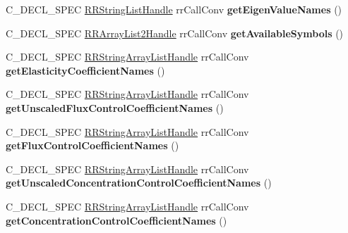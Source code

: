 \begin{DoxyCompactItemize}
\item 
\hypertarget{group__loadsave_ga313f81d4fae0ece305eb1246543bcdc3}{
\-C\-\_\-\-D\-E\-C\-L\-\_\-\-S\-P\-E\-C \hyperlink{rr__c__types_8h_abf561b014879247b7b92ee99c205de21}{\-R\-R\-String\-List\-Handle} \*
rr\-Call\-Conv {\bfseries get\-Eigen\-Value\-Names} ()}
\label{group__loadsave_ga313f81d4fae0ece305eb1246543bcdc3}

\item 
\hypertarget{group__loadsave_gaa06a430f57d4df400e58fd954766901c}{
\-C\-\_\-\-D\-E\-C\-L\-\_\-\-S\-P\-E\-C \hyperlink{rr__c__types_8h_a21a10f01ac4fd34c61e7e7d12af9891d}{\-R\-R\-Array\-List2\-Handle} \*
rr\-Call\-Conv {\bfseries get\-Available\-Symbols} ()}
\label{group__loadsave_gaa06a430f57d4df400e58fd954766901c}

\item 
\hypertarget{group__loadsave_ga35b2d80dfae3ffba81a45a485e30b22e}{
\-C\-\_\-\-D\-E\-C\-L\-\_\-\-S\-P\-E\-C \*
\hyperlink{struct_r_r_string_array_list}{\-R\-R\-String\-Array\-List\-Handle} \*
rr\-Call\-Conv {\bfseries get\-Elasticity\-Coefficient\-Names} ()}
\label{group__loadsave_ga35b2d80dfae3ffba81a45a485e30b22e}

\item 
\hypertarget{group__loadsave_ga9451fdf700b80288c0d664193eef4421}{
\-C\-\_\-\-D\-E\-C\-L\-\_\-\-S\-P\-E\-C \*
\hyperlink{struct_r_r_string_array_list}{\-R\-R\-String\-Array\-List\-Handle} \*
rr\-Call\-Conv {\bfseries get\-Unscaled\-Flux\-Control\-Coefficient\-Names} ()}
\label{group__loadsave_ga9451fdf700b80288c0d664193eef4421}

\item 
\hypertarget{group__loadsave_ga5d72e660bc33c6cbb93aadd603015563}{
\-C\-\_\-\-D\-E\-C\-L\-\_\-\-S\-P\-E\-C \*
\hyperlink{struct_r_r_string_array_list}{\-R\-R\-String\-Array\-List\-Handle} \*
rr\-Call\-Conv {\bfseries get\-Flux\-Control\-Coefficient\-Names} ()}
\label{group__loadsave_ga5d72e660bc33c6cbb93aadd603015563}

\item 
\hypertarget{group__loadsave_ga4cd50e9e57140cb5fd69483bc6b0656e}{
\-C\-\_\-\-D\-E\-C\-L\-\_\-\-S\-P\-E\-C \*
\hyperlink{struct_r_r_string_array_list}{\-R\-R\-String\-Array\-List\-Handle} \*
rr\-Call\-Conv {\bfseries get\-Unscaled\-Concentration\-Control\-Coefficient\-Names} ()}
\label{group__loadsave_ga4cd50e9e57140cb5fd69483bc6b0656e}

\item 
\hypertarget{group__loadsave_gac65874848b588a8c87ac04705eb88cbc}{
\-C\-\_\-\-D\-E\-C\-L\-\_\-\-S\-P\-E\-C \*
\hyperlink{struct_r_r_string_array_list}{\-R\-R\-String\-Array\-List\-Handle} \*
rr\-Call\-Conv {\bfseries get\-Concentration\-Control\-Coefficient\-Names} ()}
\label{group__loadsave_gac65874848b588a8c87ac04705eb88cbc}


\end{DoxyCompactItemize}
